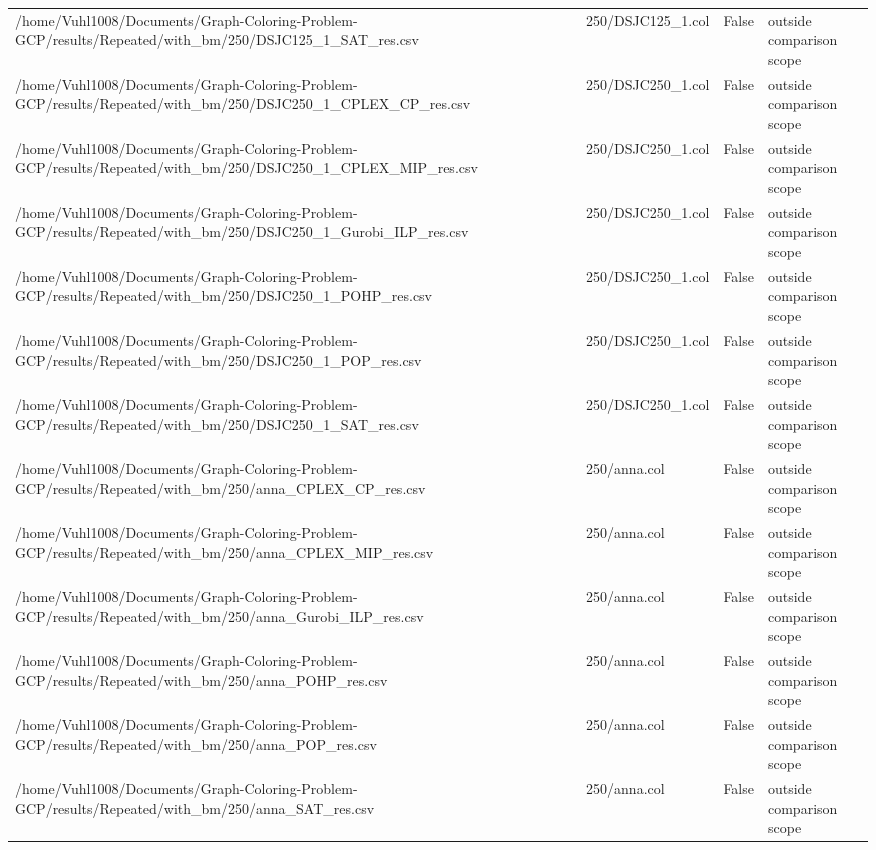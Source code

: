 \begin{table}[htbp]
\begin{tabular}{llll}
/home/Vuhl1008/Documents/Graph-Coloring-Problem-GCP/results/Repeated/with\_bm/250/DSJC125\_1\_SAT\_res.csv & 250/DSJC125\_1.col & False & outside comparison scope \\
/home/Vuhl1008/Documents/Graph-Coloring-Problem-GCP/results/Repeated/with\_bm/250/DSJC250\_1\_CPLEX\_CP\_res.csv & 250/DSJC250\_1.col & False & outside comparison scope \\
/home/Vuhl1008/Documents/Graph-Coloring-Problem-GCP/results/Repeated/with\_bm/250/DSJC250\_1\_CPLEX\_MIP\_res.csv & 250/DSJC250\_1.col & False & outside comparison scope \\
/home/Vuhl1008/Documents/Graph-Coloring-Problem-GCP/results/Repeated/with\_bm/250/DSJC250\_1\_Gurobi\_ILP\_res.csv & 250/DSJC250\_1.col & False & outside comparison scope \\
/home/Vuhl1008/Documents/Graph-Coloring-Problem-GCP/results/Repeated/with\_bm/250/DSJC250\_1\_POHP\_res.csv & 250/DSJC250\_1.col & False & outside comparison scope \\
/home/Vuhl1008/Documents/Graph-Coloring-Problem-GCP/results/Repeated/with\_bm/250/DSJC250\_1\_POP\_res.csv & 250/DSJC250\_1.col & False & outside comparison scope \\
/home/Vuhl1008/Documents/Graph-Coloring-Problem-GCP/results/Repeated/with\_bm/250/DSJC250\_1\_SAT\_res.csv & 250/DSJC250\_1.col & False & outside comparison scope \\
/home/Vuhl1008/Documents/Graph-Coloring-Problem-GCP/results/Repeated/with\_bm/250/anna\_CPLEX\_CP\_res.csv & 250/anna.col & False & outside comparison scope \\
/home/Vuhl1008/Documents/Graph-Coloring-Problem-GCP/results/Repeated/with\_bm/250/anna\_CPLEX\_MIP\_res.csv & 250/anna.col & False & outside comparison scope \\
/home/Vuhl1008/Documents/Graph-Coloring-Problem-GCP/results/Repeated/with\_bm/250/anna\_Gurobi\_ILP\_res.csv & 250/anna.col & False & outside comparison scope \\
/home/Vuhl1008/Documents/Graph-Coloring-Problem-GCP/results/Repeated/with\_bm/250/anna\_POHP\_res.csv & 250/anna.col & False & outside comparison scope \\
/home/Vuhl1008/Documents/Graph-Coloring-Problem-GCP/results/Repeated/with\_bm/250/anna\_POP\_res.csv & 250/anna.col & False & outside comparison scope \\
/home/Vuhl1008/Documents/Graph-Coloring-Problem-GCP/results/Repeated/with\_bm/250/anna\_SAT\_res.csv & 250/anna.col & False & outside comparison scope \\

\end{tabular}
\end{table}
